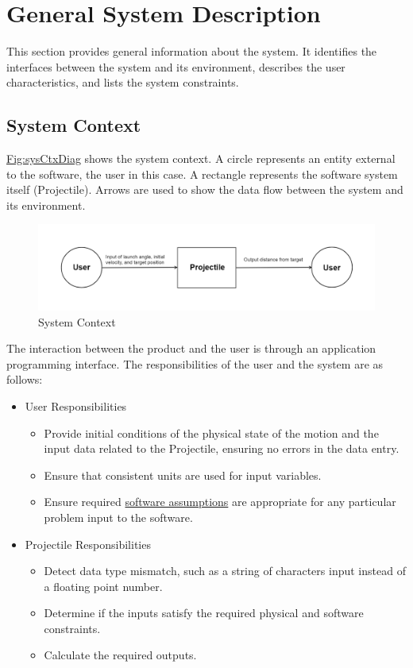\documentclass[12pt]{article}
\begin{document}
\section{General System Description}
\label{Sec:GenSysDesc}
This section provides general information about the system. It identifies the interfaces between the system and its environment, describes the user characteristics, and lists the system constraints.

\subsection{System Context}
\label{Sec:SysContext}
\hyperref[Figure:sysCtxDiag]{Fig:sysCtxDiag} shows the system context. A circle represents an entity external to the software, the user in this case. A rectangle represents the software system itself (Projectile). Arrows are used to show the data flow between the system and its environment.

\begin{figure}[H]
\begin{center}
\includegraphics[width=\textwidth]{../../../../datafiles/projectile/SystemContextFigure.png}
\caption{System Context}
\label{Figure:sysCtxDiag}
\end{center}
\end{figure}
The interaction between the product and the user is through an application programming interface. The responsibilities of the user and the system are as follows:

\begin{itemize}
\item{User Responsibilities}
\begin{itemize}
\item{Provide initial conditions of the physical state of the motion and the input data related to the Projectile, ensuring no errors in the data entry.}
\item{Ensure that consistent units are used for input variables.}
\item{Ensure required \hyperref[Sec:Assumps]{software assumptions} are appropriate for any particular problem input to the software.}
\end{itemize}
\item{Projectile Responsibilities}
\begin{itemize}
\item{Detect data type mismatch, such as a string of characters input instead of a floating point number.}
\item{Determine if the inputs satisfy the required physical and software constraints.}
\item{Calculate the required outputs.}
\end{itemize}
\end{itemize}
\end{document}
